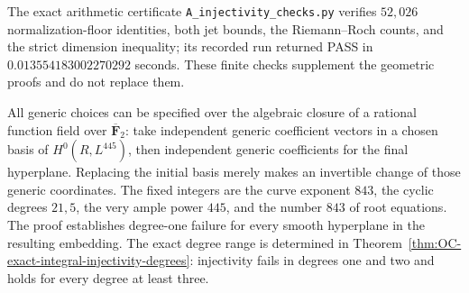 \begin{remark}
\label{rem:OC-injectivity-degrees}
The exact arithmetic certificate \texttt{A\_injectivity\_checks.py} verifies $52{,}026$ normalization-floor identities, both jet bounds, the Riemann--Roch counts, and the strict dimension inequality; its recorded run returned PASS in $0.013554183002270292$ seconds.  These finite checks supplement the geometric proofs and do not replace them.

All generic choices can be specified over the algebraic closure of a rational function field over $\overline{\mathbf F}_2$: take independent generic coefficient vectors in a chosen basis of $H^0(R,L^{445})$, then independent generic coefficients for the final hyperplane.  Replacing the initial basis merely makes an invertible change of those generic coordinates.  The fixed integers are the curve exponent $843$, the cyclic degrees $21,5$, the very ample power $445$, and the number $843$ of root equations.  The proof establishes degree-one failure for every smooth hyperplane in the resulting embedding.  The exact degree range is determined in Theorem~\ref{thm:OC-exact-integral-injectivity-degrees}: injectivity fails in degrees one and two and holds for every degree at least three.
\end{remark}
